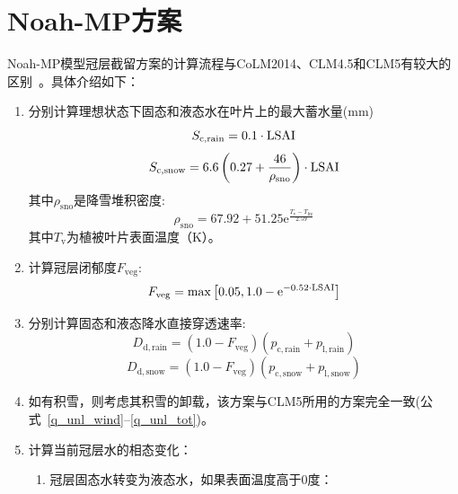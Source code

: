 \section{Noah-MP方案}
Noah-MP模型冠层截留方案的计算流程与CoLM2014、CLM4.5和CLM5有较大的区别~\citep{niu2011community,he2023modernizing}。具体介绍如下：
\begin{enumerate}
  \item 分别计算理想状态下固态和液态水在叶片上的最大蓄水量(mm)\\
    \begin{equation}
      S_{\mathrm{c,rain}}=0.1\cdot{\rm LSAI}\\
    \end{equation}
    \begin{equation}
      S_{\mathrm{c,snow}}= 6.6\left(0.27+{\frac{46}{\rho_{\mathrm{sno}}}}\right) \cdot{\rm LSAI}
    \end{equation}
    其中$\rho_{\mathrm{sno}}$是降雪堆积密度:
    \begin{equation}
      \rho_{\mathrm{sno}}=67.92+51.25 {\mathrm e}^{\frac{T_{\mathrm{v}}-T_{\mathrm{frz}}}{2.59}}
    \end{equation}
其中$T_{\mathrm{v}}$为植被叶片表面温度（K）。
  \item 计算冠层闭郁度$F_{\mathrm{veg}}$:
    \begin{equation}
      F_{\mathrm{veg}} = \max\left[0.05,1.0-{\mathrm e}^{-0.52\cdot{\rm LSAI}}\right]
    \end{equation}
  \item 分别计算固态和液态降水直接穿透速率:
    \begin{equation}
      D_{\mathrm{d,rain}}=\left(1.0-F_{\mathrm{veg}}\right)  (p_{\mathrm{c,rain}}+p_{\mathrm{l,rain}})
    \end{equation}
    \begin{equation}
      D_{\mathrm{d,snow}}=\left(1.0-F_{\mathrm{veg}}\right)  (p_{\mathrm{c,snow}}+p_{\mathrm{l,snow}})
    \end{equation}
  \item 如有积雪，则考虑其积雪的卸载，该方案与CLM5所用的方案完全一致(公式~\eqref{q_unl_wind}--\eqref{q_unl_tot})。
  \item 计算当前冠层水的相态变化：
    \begin{enumerate}
      \item 冠层固态水转变为液态水，如果表面温度高于0度：
        \begin{equation}
          \begin{aligned}

\end{aligned}
\end{equation}
\end{enumerate}
\end{enumerate}
